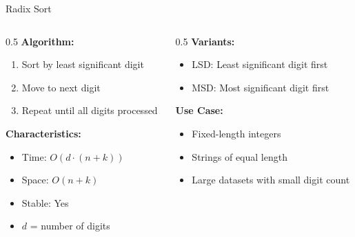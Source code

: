 \documentclass[aspectratio=169,xcolor=dvipsnames]{beamer}
\begin{document}
\begin{frame}{Radix Sort}
  \begin{columns}
    \begin{column}{0.5\textwidth}
      \textbf{Algorithm:}
      \begin{enumerate}
        \item Sort by least significant digit
        \item Move to next digit
        \item Repeat until all digits processed
      \end{enumerate}

      \vspace{0.3cm}
      \textbf{Characteristics:}
      \begin{itemize}
        \item Time: $O(d \cdot (n + k))$
        \item Space: $O(n + k)$
        \item Stable: Yes
        \item $d$ = number of digits
      \end{itemize}
    \end{column}

    \begin{column}{0.5\textwidth}
      \textbf{Variants:}
      \begin{itemize}
        \item LSD: Least significant digit first
        \item MSD: Most significant digit first
      \end{itemize}

      \vspace{0.3cm}
      \textbf{Use Case:}
      \begin{itemize}
        \item Fixed-length integers
        \item Strings of equal length
        \item Large datasets with small digit count
      \end{itemize}
    \end{column}
  \end{columns}
\end{frame}
\end{document}
